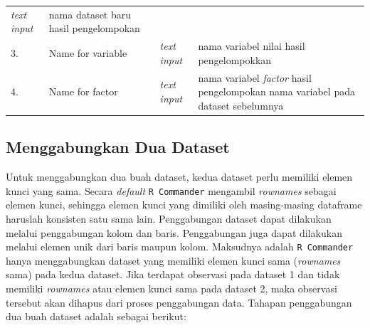 \documentclass[12pt,]{krantz}
\begin{document}
\begin{longtable}[]{@{}llll@{}}
\begin{minipage}[t]{0.09\columnwidth}
\emph{text input}\strut
\end{minipage} & \begin{minipage}[t]{0.61\columnwidth}\raggedright
nama dataset baru hasil pengelompokan\strut
\end{minipage}\tabularnewline
\begin{minipage}[t]{0.04\columnwidth}\raggedright
3.\strut
\end{minipage} & \begin{minipage}[t]{0.14\columnwidth}\raggedright
Name for variable\strut
\end{minipage} & \begin{minipage}[t]{0.09\columnwidth}\raggedright
\emph{text input}\strut
\end{minipage} & \begin{minipage}[t]{0.61\columnwidth}\raggedright
nama variabel nilai hasil pengelompokkan\strut
\end{minipage}\tabularnewline
\begin{minipage}[t]{0.04\columnwidth}\raggedright
4.\strut
\end{minipage} & \begin{minipage}[t]{0.14\columnwidth}\raggedright
Name for factor\strut
\end{minipage} & \begin{minipage}[t]{0.09\columnwidth}\raggedright
\emph{text input}\strut
\end{minipage} & \begin{minipage}[t]{0.61\columnwidth}\raggedright
nama variabel \emph{factor} hasil pengelompokan nama variabel pada dataset sebelumnya\strut
\end{minipage}\tabularnewline
\bottomrule
\end{longtable}

\hypertarget{menggabungkan-dua-dataset}{%
\subsection{Menggabungkan Dua Dataset}\label{menggabungkan-dua-dataset}}

Untuk menggabungkan dua buah dataset, kedua dataset perlu memiliki elemen kunci yang sama. Secara \emph{default} \texttt{R\ Commander} mengambil \emph{rownames} sebagai elemen kunci, sehingga elemen kunci yang dimiliki oleh masing-masing dataframe haruslah konsisten satu sama lain. Penggabungan dataset dapat dilakukan melalui penggabungan kolom dan baris. Penggabungan juga dapat dilakukan melalui elemen unik dari baris maupun kolom. Maksudnya adalah \texttt{R\ Commander} hanya menggabungkan dataset yang memiliki elemen kunci sama (\emph{rownames} sama) pada kedua dataset. Jika terdapat observasi pada dataset 1 dan tidak memiliki \emph{rownames} atau elemen kunci sama pada dataset 2, maka observasi tersebut akan dihapus dari proses penggabungan data. Tahapan penggabungan dua buah dataset adalah sebagai berikut:
\end{document}
